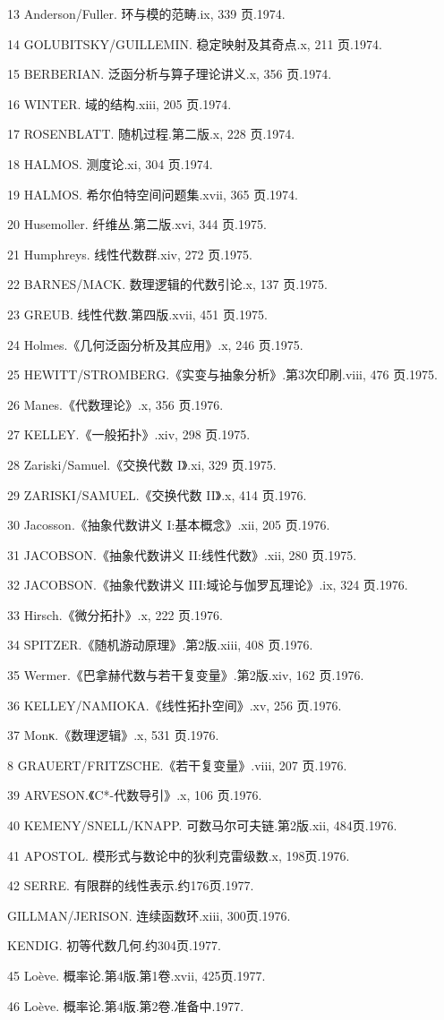 \documentclass[10pt]{article}
\begin{document}
13 Anderson/Fuller. 环与模的范畴.ix, 339 页.1974.

14 GOLUBITSKY/GUILLEMIN. 稳定映射及其奇点.x, 211 页.1974.

15 BERBERIAN. 泛函分析与算子理论讲义.x, 356 页.1974.

16 WINTER. 域的结构.xiii, 205 页.1974.

17 ROSENBLATT. 随机过程.第二版.x, 228 页.1974.

18 HALMOS. 测度论.xi, 304 页.1974.

19 HALMOS. 希尔伯特空间问题集.xvii, 365 页.1974.

20 Husemoller. 纤维丛.第二版.xvi, 344 页.1975.

21 Humphreys. 线性代数群.xiv, 272 页.1975.

22 BARNES/MACK. 数理逻辑的代数引论.x, 137 页.1975.

23 GREUB. 线性代数.第四版.xvii, 451 页.1975.

24 Holmes.《几何泛函分析及其应用》.x, 246 页.1975.

25 HEWITT/STROMBERG.《实变与抽象分析》.第3次印刷.viii, 476 页.1975.

26 Manes.《代数理论》.x, 356 页.1976.

27 KELLEY.《一般拓扑》.xiv, 298 页.1975.

28 Zariski/Samuel.《交换代数 I》.xi, 329 页.1975.

29 ZARISKI/SAMUEL.《交换代数 II》.x, 414 页.1976.

30 Jacosson.《抽象代数讲义 I:基本概念》.xii, 205 页.1976.

31 JACOBSON.《抽象代数讲义 II:线性代数》.xii, 280 页.1975.

32 JACOBSON.《抽象代数讲义 III:域论与伽罗瓦理论》.ix, 324 页.1976.

33 Hirsch.《微分拓扑》.x, 222 页.1976.

34 SPITZER.《随机游动原理》.第2版.xiii, 408 页.1976.

35 Wermer.《巴拿赫代数与若干复变量》.第2版.xiv, 162 页.1976.

36 KELLEY/NAMIOKA.《线性拓扑空间》.xv, 256 页.1976.

37 Monκ.《数理逻辑》.x, 531 页.1976.

8 GRAUERT/FRITZSCHE.《若干复变量》.viii, 207 页.1976.

39 ARVESON.《C*-代数导引》.x, 106 页.1976.

40 KEMENY/SNELL/KNAPP. 可数马尔可夫链.第2版.xii, 484页.1976.

41 APOSTOL. 模形式与数论中的狄利克雷级数.x, 198页.1976.

42 SERRE. 有限群的线性表示.约176页.1977.

GILLMAN/JERISON. 连续函数环.xiii, 300页.1976.

KENDIG. 初等代数几何.约304页.1977.

45 Loève. 概率论.第4版.第1卷.xvii, 425页.1977.

46 Loève. 概率论.第4版.第2卷.准备中.1977.
\end{document}
